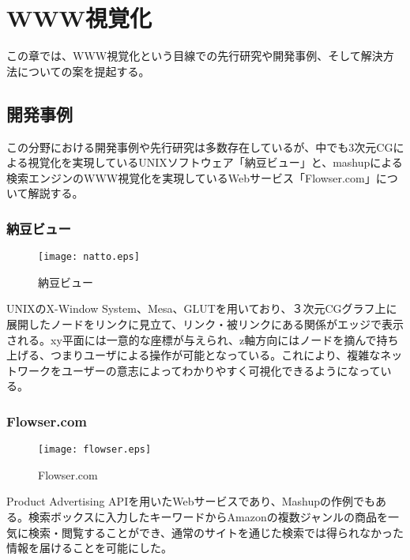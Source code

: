 \chapter{WWW視覚化}
\label{chap:visualize}

この章では、WWW視覚化という目線での先行研究や開発事例、そして解決方法についての案を提起する。

\section{開発事例}
この分野における開発事例や先行研究は多数存在しているが、中でも3次元CGによる視覚化を実現しているUNIXソフトウェア「納豆ビュー」と、mashupによる検索エンジンのWWW視覚化を実現しているWebサービス「Flowser.com」について解説する。

\subsection{納豆ビュー}
\begin{figure}[htbp]
\begin{center}
\texttt{[image: natto.eps]}
\caption{納豆ビュー}
\label{納豆ビュー}
\end{center}
\end{figure}
UNIXのX-Window System、Mesa、GLUTを用いており、３次元CGグラフ上に展開したノードをリンクに見立て、リンク・被リンクにある関係がエッジで表示される。xy平面には一意的な座標が与えられ、z軸方向にはノードを摘んで持ち上げる、つまりユーザによる操作が可能となっている。これにより、複雑なネットワークをユーザーの意志によってわかりやすく可視化できるようになっている。

\subsection{Flowser.com}
\begin{figure}[htbp]
\begin{center}
\texttt{[image: flowser.eps]}
\caption{Flowser.com}
\label{flowser}
\end{center}
\end{figure}
Product Advertising APIを用いたWebサービスであり、Mashupの作例でもある。検索ボックスに入力したキーワードからAmazonの複数ジャンルの商品を一気に検索・閲覧することができ、通常のサイトを通じた検索では得られなかった情報を届けることを可能にした。

